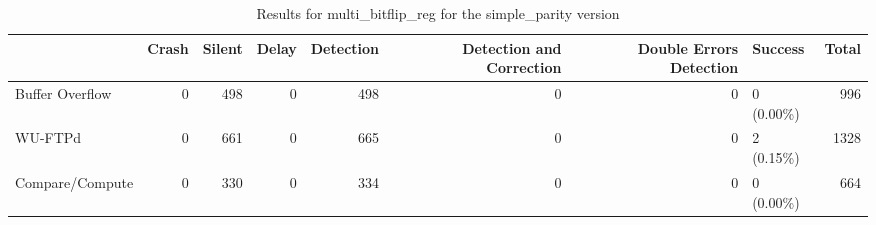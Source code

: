 \begin{table}[t]
	\centering
	\caption{Results for multi_bitflip_reg for the simple_parity version}
	\label{table:end_sim_by_status_simple_parity_1_multi_bitflip_reg}
	\begin{tabular}{lrrrrrrlr}
		\toprule
		                & Crash & Silent & Delay & Detection & Detection and Correction & Double Errors Detection & Success    & Total \\
		\midrule
		Buffer Overflow & 0     & 498    & 0     & 498       & 0                        & 0                       & 0 (0.00\%) & 996   \\
		WU-FTPd         & 0     & 661    & 0     & 665       & 0                        & 0                       & 2 (0.15\%) & 1328  \\
		Compare/Compute & 0     & 330    & 0     & 334       & 0                        & 0                       & 0 (0.00\%) & 664   \\
		\bottomrule
	\end{tabular}
\end{table}
